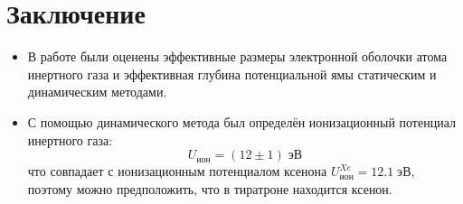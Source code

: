 \documentclass[a4paper, 12pt]{article}
\begin{document}
    \section{Заключение}
    
    \begin{itemize}
       \item В работе были оценены эффективные размеры электронной оболочки атома инертного газа и эффективная глубина потенциальной ямы статическим и динамическим методами.
        \item С помощью динамического метода был определён ионизационный потенциал инертного газа:
        $$
        U_{ион} = \left( 12 \pm 1 \right) \; эВ
        $$
        что совпадает с ионизационным потенциалом ксенона $U_{ион}^{Xe} = 12.1 \; эВ$, поэтому можно предположить, что в тиратроне находится ксенон.
    \end{itemize}
    
\end{document}
